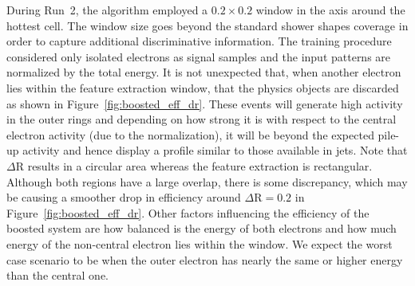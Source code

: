During Run~2, the \rnn{} algorithm employed a $0.2\times0.2$ window in the
\etaphi axis around the hottest cell. The window size goes beyond the standard
shower shapes coverage in order to capture additional discriminative
information. The training procedure considered only isolated electrons as signal
samples and the input patterns are normalized by the total energy. It is not
unexpected that, when another electron lies within the \rnn{} feature extraction
window, that the physics objects are discarded as shown in
Figure~\ref{fig:boosted_eff_dr}. These events will generate high activity in the
outer rings and depending on how strong it is with respect to the central
electron activity (due to the normalization), it will be beyond the expected
pile-up activity and hence display a profile similar to those available in jets.
Note that $\Delta$R results in a circular area whereas the \rnn{} feature
extraction is rectangular. Although both regions have a large overlap, there is
some discrepancy, which may be causing a smoother drop in efficiency around
$\Delta\text{R}=0.2$ in Figure~\ref{fig:boosted_eff_dr}. Other factors influencing the efficiency of the boosted system are
how balanced is the energy of both electrons and how much energy of
the non-central electron lies within
the window. We expect the worst case scenario to be when the outer electron has
nearly the same or higher energy than the central one.




